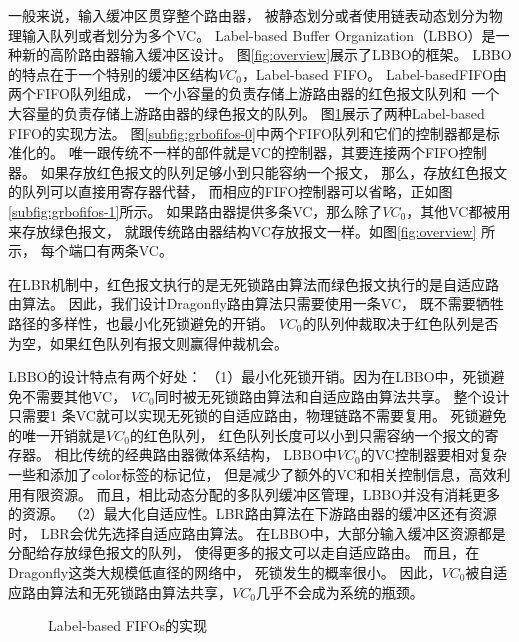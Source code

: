 一般来说，输入缓冲区贯穿整个路由器，
被静态划分或者使用链表动态划分为物理输入队列或者划分为多个VC。
Label-based Buffer Organization（LBBO）是一种新的高阶路由器输入缓冲区设计。
图\ref{fig:overview}展示了LBBO的框架。
LBBO的特点在于一个特别的缓冲区结构$VC_0$，Label-based FIFO。
Label-basedFIFO由两个FIFO队列组成，
一个小容量的负责存储上游路由器的红色报文队列和
一个大容量的负责存储上游路由器的绿色报文的队列。
图\ref{fig:grbofifos}展示了两种Label-based FIFO的实现方法。
图\ref{subfig:grbofifos-0}中两个FIFO队列和它们的控制器都是标准化的。
唯一跟传统不一样的部件就是VC的控制器，其要连接两个FIFO控制器。
如果存放红色报文的队列足够小到只能容纳一个报文，
那么，存放红色报文的队列可以直接用寄存器代替，
而相应的FIFO控制器可以省略，正如图\ref{subfig:grbofifos-1}所示。
如果路由器提供多条VC，那么除了$VC_0$，其他VC都被用来存放绿色报文，
就跟传统路由器结构VC存放报文一样。如图\ref{fig:overview} 所示，
每个端口有两条VC。

在LBR机制中，红色报文执行的是无死锁路由算法而绿色报文执行的是自适应路由算法。
因此，我们设计Dragonfly路由算法只需要使用一条VC，
既不需要牺牲路径的多样性，也最小化死锁避免的开销。
$VC_0$的队列仲裁取决于红色队列是否为空，如果红色队列有报文则赢得仲裁机会。

LBBO的设计特点有两个好处：
（1）最小化死锁开销。因为在LBBO中，死锁避免不需要其他VC，
$VC_0$同时被无死锁路由算法和自适应路由算法共享。
整个设计只需要1 条VC就可以实现无死锁的自适应路由，物理链路不需要复用。
死锁避免的唯一开销就是$VC_0$的红色队列，
红色队列长度可以小到只需容纳一个报文的寄存器。
相比传统的经典路由器微体系结构，
LBBO中$VC_0$的VC控制器要相对复杂一些和添加了color标签的标记位，
但是减少了额外的VC和相关控制信息，高效利用有限资源。
而且，相比动态分配的多队列缓冲区管理，LBBO并没有消耗更多的资源。
（2）最大化自适应性。LBR路由算法在下游路由器的缓冲区还有资源时，
LBR会优先选择自适应路由算法。
在LBBO中，大部分输入缓冲区资源都是分配给存放绿色报文的队列，
使得更多的报文可以走自适应路由。
而且，在Dragonfly这类大规模低直径的网络中，
死锁发生的概率很小。
因此，$VC_0$被自适应路由算法和无死锁路由算法共享，$VC_0$几乎不会成为系统的瓶颈。

\begin{figure}[t]
  \centering
  \caption{Label-based FIFOs的实现}
  \label{fig:grbofifos}
\end{figure}

